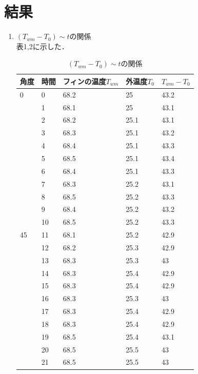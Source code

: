 \documentclass[twocolumn, 10pt,a4j]{jsarticle}
\begin{document}
\section{結果}
\begin{enumerate}
  \item $(T_{wm} - T_{0}) \sim tの関係$ \\
    表1,2に示した．
    \begin{table}[]
      \centering
      \caption{$(T_{wm} - T_{0}) \sim tの関係$}
      \label{my-label}
      \footnotesize
      \begin{tabular}{lllll}
      角度 & 時間 & フィンの温度$T_{wm}$ & 外温度$T_{0}$ & $T_{wm}-T_{0}$ \\ \hline
      0&0&68.2&25&43.2 \\
      &1&68.1&25&43.1  \\
      &2&68.2&25.1&43.1  \\
      &3&68.3&25.1&43.2  \\
      &4&68.4&25.1&43.3  \\
      &5&68.5&25.1&43.4  \\
      &6&68.4&25.1&43.3  \\
      &7&68.3&25.2&43.1  \\
      &8&68.5&25.2&43.3  \\
      &9&68.4&25.2&43.2  \\
      &10&68.5&25.2&43.3  \\
      45&11&68.1&25.2&42.9  \\
      &12&68.2&25.3&42.9  \\
      &13&68.3&25.3&43  \\
      &14&68.3&25.4&42.9  \\
      &15&68.3&25.4&42.9  \\
      &16&68.3&25.3&43  \\
      &17&68.3&25.4&42.9  \\
      &18&68.3&25.4&42.9  \\
      &19&68.5&25.4&43.1  \\
      &20&68.5&25.5&43  \\
      &21&68.5&25.5&43  \\
      \end{tabular}
      \end{table}


\end{enumerate}
\end{document}
